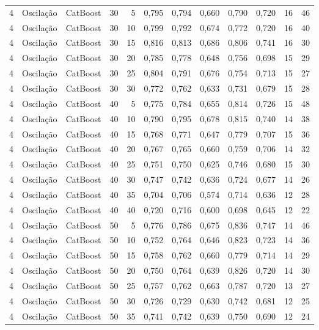 \begin{longtable}{@{}rllrrrrrrrrr@{}}
4 & Oscilação & CatBoost & 30 & 5 & 0,795 & 0,794 & 0,660 & 0,790 & 0,720 & 16 & 46 \\
4 & Oscilação & CatBoost & 30 & 10 & 0,799 & 0,792 & 0,674 & 0,772 & 0,720 & 16 & 40 \\
4 & Oscilação & CatBoost & 30 & 15 & 0,816 & 0,813 & 0,686 & 0,806 & 0,741 & 16 & 30 \\
4 & Oscilação & CatBoost & 30 & 20 & 0,785 & 0,778 & 0,648 & 0,756 & 0,698 & 15 & 29 \\
4 & Oscilação & CatBoost & 30 & 25 & 0,804 & 0,791 & 0,676 & 0,754 & 0,713 & 15 & 27 \\
4 & Oscilação & CatBoost & 30 & 30 & 0,772 & 0,762 & 0,633 & 0,731 & 0,679 & 15 & 28 \\
4 & Oscilação & CatBoost & 40 & 5 & 0,775 & 0,784 & 0,655 & 0,814 & 0,726 & 15 & 48 \\
4 & Oscilação & CatBoost & 40 & 10 & 0,790 & 0,795 & 0,678 & 0,815 & 0,740 & 14 & 38 \\
4 & Oscilação & CatBoost & 40 & 15 & 0,768 & 0,771 & 0,647 & 0,779 & 0,707 & 15 & 36 \\
4 & Oscilação & CatBoost & 40 & 20 & 0,767 & 0,765 & 0,660 & 0,759 & 0,706 & 14 & 32 \\
4 & Oscilação & CatBoost & 40 & 25 & 0,751 & 0,750 & 0,625 & 0,746 & 0,680 & 15 & 30 \\
4 & Oscilação & CatBoost & 40 & 30 & 0,747 & 0,742 & 0,636 & 0,724 & 0,677 & 14 & 26 \\
4 & Oscilação & CatBoost & 40 & 35 & 0,704 & 0,706 & 0,574 & 0,714 & 0,636 & 12 & 28 \\
4 & Oscilação & CatBoost & 40 & 40 & 0,720 & 0,716 & 0,600 & 0,698 & 0,645 & 12 & 22 \\
4 & Oscilação & CatBoost & 50 & 5 & 0,776 & 0,786 & 0,675 & 0,836 & 0,747 & 14 & 46 \\
4 & Oscilação & CatBoost & 50 & 10 & 0,752 & 0,764 & 0,646 & 0,823 & 0,723 & 14 & 36 \\
4 & Oscilação & CatBoost & 50 & 15 & 0,758 & 0,762 & 0,660 & 0,779 & 0,714 & 14 & 29 \\
4 & Oscilação & CatBoost & 50 & 20 & 0,750 & 0,764 & 0,639 & 0,826 & 0,720 & 14 & 30 \\
4 & Oscilação & CatBoost & 50 & 25 & 0,757 & 0,762 & 0,663 & 0,787 & 0,720 & 13 & 27 \\
4 & Oscilação & CatBoost & 50 & 30 & 0,726 & 0,729 & 0,630 & 0,742 & 0,681 & 12 & 25 \\
4 & Oscilação & CatBoost & 50 & 35 & 0,741 & 0,742 & 0,639 & 0,750 & 0,690 & 12 & 24 \\

\end{longtable}
